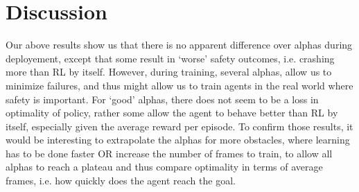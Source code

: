   \section{Discussion}
  Our above results show us that there is no apparent difference over
  alphas during deployement, except that some result in `worse' safety outcomes, i.e. crashing more than RL by itself.  
  However, during training, several alphas, allow us to minimize failures, and thus might allow us to train agents in the real world where safety is important. 
  For `good' alphas, there does not seem to be a loss in optimality of policy, rather some allow the agent to behave better than RL by itself, especially given the average reward per episode. 
  To confirm those results, it would be interesting to extrapolate the alphas for more obstacles, where learning has to be done faster OR increase the number of frames to train, to allow all alphas 
  to reach a plateau and thus compare optimality in terms of average frames, i.e. how quickly does the agent reach the goal. 






